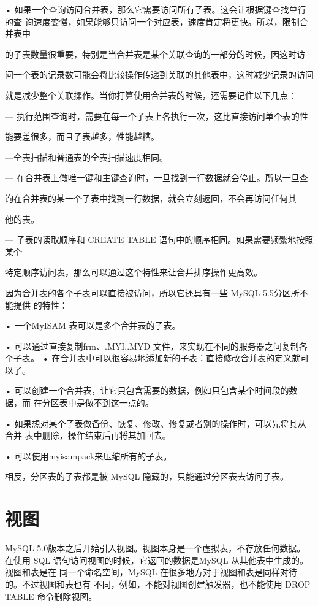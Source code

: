 • 如果一个查询访问合并表，那么它需要访问所有子表。这会让根据键查找单行的查
询速度变慢，如果能够只访问一个对应表，速度肯定将更快。所以，限制合并表中

的子表数量很重要，特别是当合并表是某个关联查询的一部分的时候，因这时访

问一个表的记录数可能会将比较操作传递到关联的其他表中，这时减少记录的访问

就是减少整个关联操作。当你打算使用合并表的时候，还需要记住以下几点：

— 执行范围查询时，需要在每一个子表上各执行一次，这比直接访问单个表的性

能要差很多，而且子表越多，性能越糟。

—全表扫描和普通表的全表扫描速度相同。

— 在合并表上做唯一键和主键查询时，一旦找到一行数据就会停止。所以一旦查

询在合并表的某一个子表中找到一行数据，就会立刻返回，不会再访问任何其

他的表。

— 子表的读取顺序和 CREATE TABLE 语句中的顺序相同。如果需要频繁地按照某个

特定顺序访问表，那么可以通过这个特性来让合并排序操作更高效。

因为合并表的各个子表可以直接被访问，所以它还具有一些 MySQL 5.5分区所不能提供
的特性：

• 一个MyISAM 表可以是多个合并表的子表。

• 可以通过直接复制frm、.MYI..MYD 文件，来实现在不同的服务器之间复制各个子表。
• 在合并表中可以很容易地添加新的子表：直接修改合并表的定义就可以了。

• 可以创建一个合并表，让它只包含需要的数据，例如只包含某个时间段的数据，而
在分区表中是做不到这一点的。

• 如果想对某个子表做备份、恢复、修改、修复或者别的操作时，可以先将其从合并
表中删除，操作结束后再将其加回去。

• 可以使用myisampack来压缩所有的子表。

相反，分区表的子表都是被 MySQL 隐藏的，只能通过分区表去访问子表。

\section{视图}
MySQL 5.0版本之后开始引入视图。视图本身是一个虚拟表，不存放任何数据。在使用
SQL 语句访问视图的时候，它返回的数据是MySQL 从其他表中生成的。视图和表是在
同一个命名空间，MySQL 在很多地方对于视图和表是同样对待的。不过视图和表也有
不同，例如，不能对视图创建触发器，也不能使用 DROP TABLE 命令删除视图。

